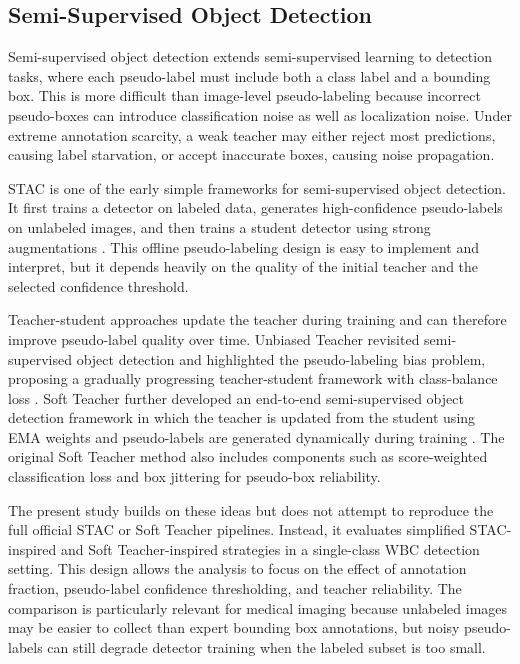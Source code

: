 \documentclass[conference,a4paper]{IEEEtran}
\begin{document}
\subsection{Semi-Supervised Object Detection}
Semi-supervised object detection extends semi-supervised learning to detection tasks, where each pseudo-label must include both a class label and a bounding box. This is more difficult than image-level pseudo-labeling because incorrect pseudo-boxes can introduce classification noise as well as localization noise. Under extreme annotation scarcity, a weak teacher may either reject most predictions, causing label starvation, or accept inaccurate boxes, causing noise propagation.

STAC is one of the early simple frameworks for semi-supervised object detection. It first trains a detector on labeled data, generates high-confidence pseudo-labels on unlabeled images, and then trains a student detector using strong augmentations \cite{sohn2020stac}. This offline pseudo-labeling design is easy to implement and interpret, but it depends heavily on the quality of the initial teacher and the selected confidence threshold.

Teacher-student approaches update the teacher during training and can therefore improve pseudo-label quality over time. Unbiased Teacher revisited semi-supervised object detection and highlighted the pseudo-labeling bias problem, proposing a gradually progressing teacher-student framework with class-balance loss \cite{liu2021unbiasedteacher}. Soft Teacher further developed an end-to-end semi-supervised object detection framework in which the teacher is updated from the student using EMA weights and pseudo-labels are generated dynamically during training \cite{xu2021softteacher}. The original Soft Teacher method also includes components such as score-weighted classification loss and box jittering for pseudo-box reliability.

The present study builds on these ideas but does not attempt to reproduce the full official STAC or Soft Teacher pipelines. Instead, it evaluates simplified STAC-inspired and Soft Teacher-inspired strategies in a single-class WBC detection setting. This design allows the analysis to focus on the effect of annotation fraction, pseudo-label confidence thresholding, and teacher reliability. The comparison is particularly relevant for medical imaging because unlabeled images may be easier to collect than expert bounding box annotations, but noisy pseudo-labels can still degrade detector training when the labeled subset is too small.
\end{document}
